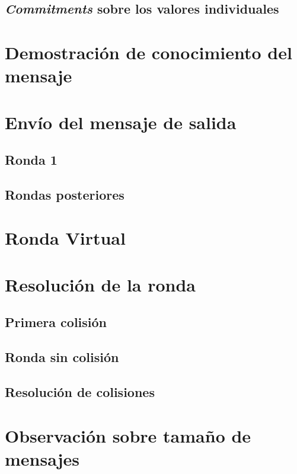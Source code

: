 \subsection{\emph{Commitments} sobre los valores individuales}



\section{Demostración de conocimiento del mensaje}
\section{Envío del mensaje de salida}
\subsection{Ronda 1}
\subsection{Rondas posteriores}
\section{Ronda Virtual}
\section{Resolución de la ronda}
\subsection{Primera colisión}
\subsection{Ronda sin colisión}
\subsection{Resolución de colisiones}
\section{Observación sobre tamaño de mensajes}